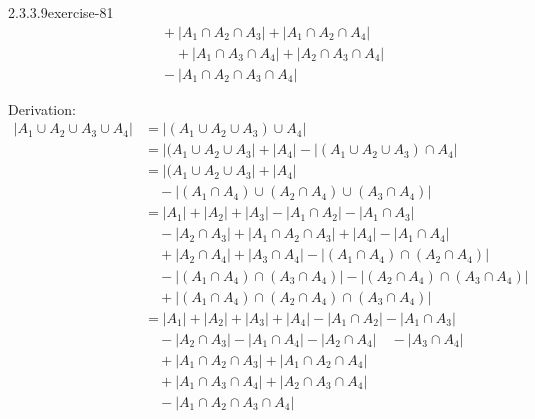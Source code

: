 \documentclass[twoside,10pt,]{book}
\numberwithin{equation}{section}
\begin{document}
\begin{divisionsolution}{2.3.3.9}{}{exercise-81}
\begin{equation*}
\begin{split}
& \quad +\lvert A_1\cap A_2\cap A_3\rvert +\lvert A_1\cap A_2\cap A_4\rvert   \\
& \quad \quad +\lvert A_1\cap A_3\cap A_4\rvert +\lvert A_2\cap A_3\cap A_4\rvert \\
& \quad   -\lvert A_1\cap A_2\cap A_3\cap A_4\rvert  
\end{split}
\end{equation*}
%
\par
\hypertarget{p-767}{}%
Derivation:%
\begin{equation*}
\begin{split}
\lvert A_1\cup A_2\cup A_3\cup A_4\rvert & = \lvert (A_1\cup A_2\cup A_3)\cup A_4\rvert  \\
& = \lvert  (A_1\cup A_2\cup A_3\rvert   +\lvert  A_4\rvert  -\lvert (A_1\cup A_2\cup A_3)\cap A_4\rvert\\
& = \lvert  (A_1\cup A_2\cup A_3\rvert   +\lvert  A_4\rvert \\
& \quad -\lvert (A_1\cap A_4)\cup (A_2\cap A_4)\cup (A_3\cap A_4)\rvert  \\
& = \lvert  A_1\rvert  +\lvert  A_2\rvert  +\lvert  A_3\rvert  -\lvert A_1\cap A_2\rvert  -\lvert A_1\cap A_3\rvert  \\
& \quad -\lvert A_2\cap A_3\rvert   +\lvert A_1\cap A_2\cap A_3\rvert   +\lvert  A_4\rvert  -\lvert A_1\cap A_4\rvert    \\
& \quad+\lvert A_2\cap A_4\rvert   +\lvert A_3\cap A_4\rvert  -\lvert (A_1\cap A_4)\cap (A_2\cap A_4)\rvert  \\
& \quad  -\lvert (A_1\cap A_4)\cap (A_3\cap A_4)\rvert   -\lvert (A_2\cap A_4)\cap (A_3\cap A_4)\rvert \\
& \quad  +\lvert (A_1\cap A_4)\cap (A_2\cap A_4)\cap (A_3\cap A_4)\rvert  \\
& =\lvert  A_1\rvert  +\lvert  A_2\rvert  +\lvert  A_3\rvert  +\lvert  A_4\rvert  -\lvert A_1\cap A_2\rvert   -\lvert A_1\cap A_3\rvert   \\
& \quad  -\lvert A_2\cap A_3\rvert   -\lvert A_1\cap A_4\rvert   -\lvert A_2\cap A_4\rvert  \quad  -\lvert A_3\cap A_4\rvert  \\
& \quad  +\lvert A_1\cap A_2\cap A_3\rvert  +\lvert A_1\cap A_2\cap A_4\rvert  \\
& \quad  +\lvert A_1\cap A_3\cap A_4\rvert  +\lvert A_2\cap A_3\cap A_4\rvert \\
& \quad     -\lvert A_1\cap A_2 \cap A_3\cap A_4\rvert 
\end{split}   
\end{equation*}
%
\end{divisionsolution}%
\end{document}
